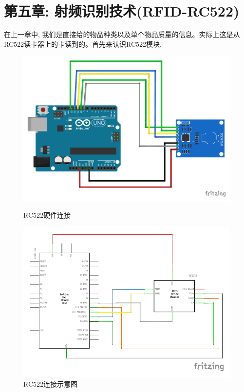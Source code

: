 \documentclass{article}
\begin{document}
\section{第五章: 射频识别技术(RFID-RC522)}
在上一章中, 我们是直接给的物品种类以及单个物品质量的信息。实际上这是从RC522读卡器上的卡读到的。首先来认识RC522模块,
\begin{figure}[h]
	\centering
	\begin{minipage}{.45\textwidth}
		\centering
		\includegraphics[width=\linewidth]{../5_Chapter5_RC522/Picture/RFID_RC522.pdf}
		\caption{RC522硬件连接}
		\label{fig:RC522硬件连接}
	\end{minipage}%
	\hfill
	\begin{minipage}{.45\textwidth}
		\centering
		\includegraphics[width=\linewidth]{../5_Chapter5_RC522/Picture/RFID_RC522_line.pdf}
		\caption{RC522连接示意图}
		\label{fig:RC522连接示意图}
	\end{minipage}
\end{figure}
\end{document}
